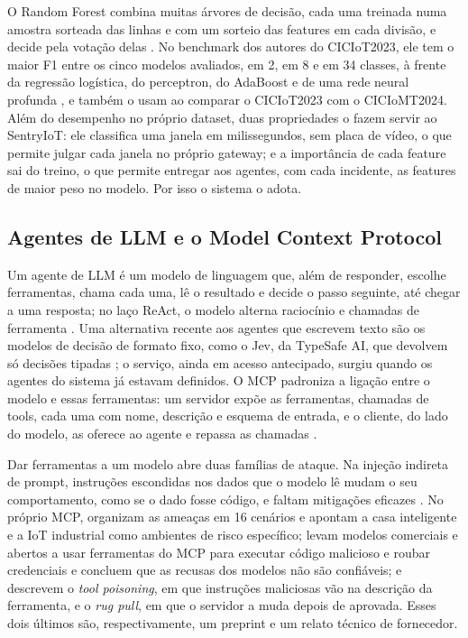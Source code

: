 O Random Forest combina muitas árvores de decisão, cada uma treinada numa amostra sorteada das linhas e com um sorteio das features em cada divisão, e decide pela votação delas \cite{breiman2001}. No benchmark dos autores do CICIoT2023, ele tem o maior F1 entre os cinco modelos avaliados, em 2, em 8 e em 34 classes, à frente da regressão logística, do perceptron, do AdaBoost e de uma rede neural profunda \cite{neto2023}, e  também o usam ao comparar o CICIoT2023 com o CICIoMT2024. Além do desempenho no próprio dataset, duas propriedades o fazem servir ao SentryIoT: ele classifica uma janela em milissegundos, sem placa de vídeo, o que permite julgar cada janela no próprio gateway; e a importância de cada feature sai do treino, o que permite entregar aos agentes, com cada incidente, as features de maior peso no modelo. Por isso o sistema o adota.

\subsection{Agentes de LLM e o Model Context Protocol}
\label{sec:agentes-mcp}

Um agente de LLM é um modelo de linguagem que, além de responder, escolhe ferramentas, chama cada uma, lê o resultado e decide o passo seguinte, até chegar a uma resposta; no laço ReAct, o modelo alterna raciocínio e chamadas de ferramenta \cite{yao2023}. Uma alternativa recente aos agentes que escrevem texto são os modelos de decisão de formato fixo, como o Jev, da TypeSafe AI, que devolvem só decisões tipadas \cite{typesafe2026docs}; o serviço, ainda em acesso antecipado, surgiu quando os agentes do sistema já estavam definidos. O MCP padroniza a ligação entre o modelo e essas ferramentas: um servidor expõe as ferramentas, chamadas de tools, cada uma com nome, descrição e esquema de entrada, e o cliente, do lado do modelo, as oferece ao agente e repassa as chamadas \cite{hou2026}.

Dar ferramentas a um modelo abre duas famílias de ataque. Na injeção indireta de prompt, instruções escondidas nos dados que o modelo lê mudam o seu comportamento, como se o dado fosse código, e faltam mitigações eficazes \cite{greshake2023}. No próprio MCP,  organizam as ameaças em 16 cenários e apontam a casa inteligente e a IoT industrial como ambientes de risco específico;  levam modelos comerciais e abertos a usar ferramentas do MCP para executar código malicioso e roubar credenciais e concluem que as recusas dos modelos não são confiáveis; e  descrevem o \textit{tool poisoning}, em que instruções maliciosas vão na descrição da ferramenta, e o \textit{rug pull}, em que o servidor a muda depois de aprovada. Esses dois últimos são, respectivamente, um preprint e um relato técnico de fornecedor.

